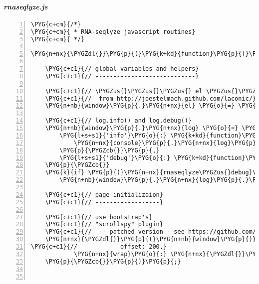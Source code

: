 \paragraph{\emph{rnaseqlyze.js}}
\label{rnaseqlyze-pdf:rnaseqlyze-js}
\begin{Verbatim}[commandchars=\\\{\},numbers=left,firstnumber=1,stepnumber=5]
\PYG{c+cm}{/*}
\PYG{c+cm}{ * RNA-seqlyze javascript routines}
\PYG{c+cm}{ */}

\PYG{n+nx}{\PYGZdl{}}\PYG{p}{(}\PYG{k+kd}{function}\PYG{p}{(}\PYG{p}{)} \PYG{p}{\PYGZob{}}

    \PYG{c+c1}{// global variables and helpers}
    \PYG{c+c1}{// ----------------------------}

    \PYG{c+c1}{// \PYGZus{}\PYGZus{}\PYGZus{} el \PYGZus{}\PYGZus{}\PYGZus{}}
    \PYG{c+c1}{//  from http://joestelmach.github.com/laconic/}
    \PYG{n+nb}{window}\PYG{p}{.}\PYG{n+nx}{el} \PYG{o}{=} \PYG{n+nx}{\PYGZdl{}}\PYG{p}{.}\PYG{n+nx}{el}\PYG{p}{;}

    \PYG{c+c1}{// log.info() and log.debug()}
    \PYG{n+nb}{window}\PYG{p}{.}\PYG{n+nx}{log} \PYG{o}{=} \PYG{p}{\PYGZob{}}
        \PYG{l+s+s1}{'info'}\PYG{o}{:} \PYG{k+kd}{function}\PYG{p}{(}\PYG{p}{)} \PYG{p}{\PYGZob{}}
            \PYG{n+nx}{console}\PYG{p}{.}\PYG{n+nx}{log}\PYG{p}{.}\PYG{n+nx}{apply}\PYG{p}{(}\PYG{n+nx}{console}\PYG{p}{,} \PYG{n+nx}{arguments}\PYG{p}{)}\PYG{p}{;}
        \PYG{p}{\PYGZcb{}}\PYG{p}{,}
        \PYG{l+s+s1}{'debug'}\PYG{o}{:} \PYG{k+kd}{function}\PYG{p}{(}\PYG{p}{)} \PYG{p}{\PYGZob{}}\PYG{p}{\PYGZcb{}}
    \PYG{p}{\PYGZcb{}}
    \PYG{k}{if} \PYG{p}{(}\PYG{n+nx}{rnaseqlyze\PYGZus{}debug}\PYG{p}{)}
        \PYG{n+nb}{window}\PYG{p}{.}\PYG{n+nx}{log}\PYG{p}{.}\PYG{n+nx}{debug} \PYG{o}{=} \PYG{n+nb}{window}\PYG{p}{.}\PYG{n+nx}{log}\PYG{p}{.}\PYG{n+nx}{info}\PYG{p}{;}

    \PYG{c+c1}{// page initializaion}
    \PYG{c+c1}{// ------------------}

    \PYG{c+c1}{// use bootstrap's}
    \PYG{c+c1}{// "scrollspy" plugin}
    \PYG{c+c1}{//  -- patched version - see https://github.com/twitter/bootstrap/pull/3829}
    \PYG{n+nx}{\PYGZdl{}}\PYG{p}{(}\PYG{n+nb}{window}\PYG{p}{)}\PYG{p}{.}\PYG{n+nx}{scrollspy}\PYG{p}{(}\PYG{p}{\PYGZob{}}
\PYG{c+c1}{//            offset: 200,}
            \PYG{n+nx}{wrap}\PYG{o}{:} \PYG{n+nx}{\PYGZdl{}}\PYG{p}{(}\PYG{l+s+s1}{'\PYGZsh{}wrap'}\PYG{p}{)}\PYG{p}{[}\PYG{l+m+mi}{0}\PYG{p}{]}\PYG{p}{,}
    \PYG{p}{\PYGZcb{}}\PYG{p}{)}\PYG{p}{;}



\end{Verbatim}
